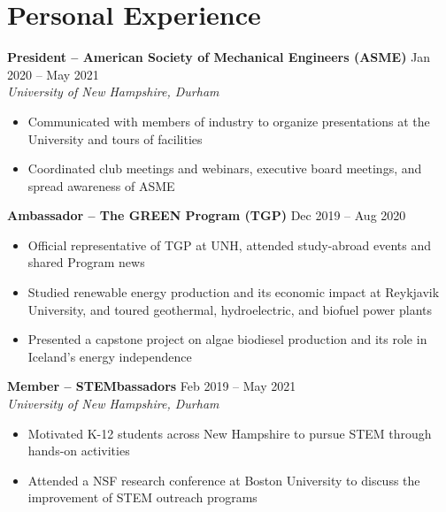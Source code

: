 \documentclass{my_resume}
\begin{document}
\section{Personal Experience}
\vspace{-0.25em}
{\textbf{President -- American Society of Mechanical Engineers (ASME)}} \hfill {Jan 2020 -- May 2021}
\\ {\em University of New Hampshire, Durham}
\begin{itemize}[label={\tiny\raisebox{1ex}{\textbullet}}, noitemsep]
    \item Communicated with members of industry to organize presentations at the University and tours of facilities
    \item Coordinated club meetings and webinars, executive board meetings, and spread awareness of ASME
\end{itemize}
\smallskip
{\textbf{Ambassador -- The GREEN Program (TGP)}} \hfill {Dec 2019 -- Aug 2020}
\begin{itemize}[label={\tiny\raisebox{1ex}{\textbullet}}, noitemsep]
    \item Official representative of TGP at UNH, attended study-abroad events and shared Program news
    \item Studied renewable energy production and its economic impact at Reykjavik University, and toured geothermal, hydroelectric, and biofuel power plants
    \item Presented a capstone project on algae biodiesel production and its role in Iceland's energy independence
\end{itemize}
\smallskip
{\textbf{Member -- STEMbassadors}} \hfill {{Feb 2019 -- May 2021}}
\\ {\em University of New Hampshire, Durham}
\begin{itemize}[label={\tiny\raisebox{1ex}{\textbullet}}, noitemsep]
    \item Motivated K-12 students across New Hampshire to pursue STEM through hands-on activities
    \item Attended a NSF research conference at Boston University to discuss the improvement of STEM outreach programs
\end{itemize}
\end{document}

